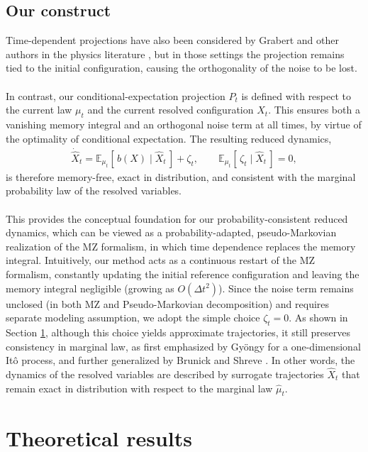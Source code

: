 \documentclass[11pt, a4paper, oneside, reqno]{amsart}
\begin{document}
\subsection{Our construct}  
\noindent Time-dependent projections have also been considered by Grabert \cite{grabert1982proj} and other authors in the physics literature \cite{_ttinger_2005,Vrugt_2020}, but in those settings the projection remains tied to the initial configuration, causing the orthogonality of the noise to be lost.  \\ \ \\ 
In contrast, our conditional-expectation projection $P_t$ is defined with respect to the {current law} $\mu_t$ and the {current resolved configuration} $\hat{X}_t$. This ensures both a vanishing memory integral  and an orthogonal noise term at all times, by virtue of the optimality of conditional expectation.  The resulting reduced dynamics,
\begin{eqnarray}\label{eq:our construct}
\dot{\hat{X}}_t = \mathbb{E}_{\mu_t}[\,{b}(X)\mid \hat{X}_t\,] +\zeta_t, 
\qquad \mathbb{E}_{\mu_t}[\,\zeta_t\mid \hat{X}_t\,]=0,
\end{eqnarray}
is therefore memory-free, exact in distribution, and consistent with the marginal probability law of the resolved variables. 
\\ \ \\
 This provides the conceptual foundation for our probability-consistent reduced dynamics, which can be viewed as a probability-adapted, pseudo-Markovian realization of the MZ formalism, in which time dependence replaces the memory integral. 
 Intuitively, our method acts as a continuous restart of the MZ formalism, constantly updating the initial reference configuration and leaving the memory integral negligible (growing as $O(\Delta t^2)$).
 Since the noise term remains unclosed (in both MZ and Pseudo-Markovian decomposition) and requires separate modeling assumption, we adopt the simple choice $\zeta_t=0$.  As shown in Section \ref{sec:optimal proba consitstent reduced dynamics}, although this choice yields approximate trajectories, it still preserves consistency in marginal law, as first emphasized by Gyöngy \cite{gyongy1986mimicking} for a one-dimensional Itô process, and further generalized by Brunick and Shreve \cite{brunick2013mimicking}. In other words, the dynamics of the resolved variables are described by surrogate trajectories $\hat{X}_t$ that remain exact in distribution with respect to the marginal law $\hat{\mu}_t$.
\section{Theoretical results}\label{sec:optimal proba consitstent reduced dynamics}
\end{document}
